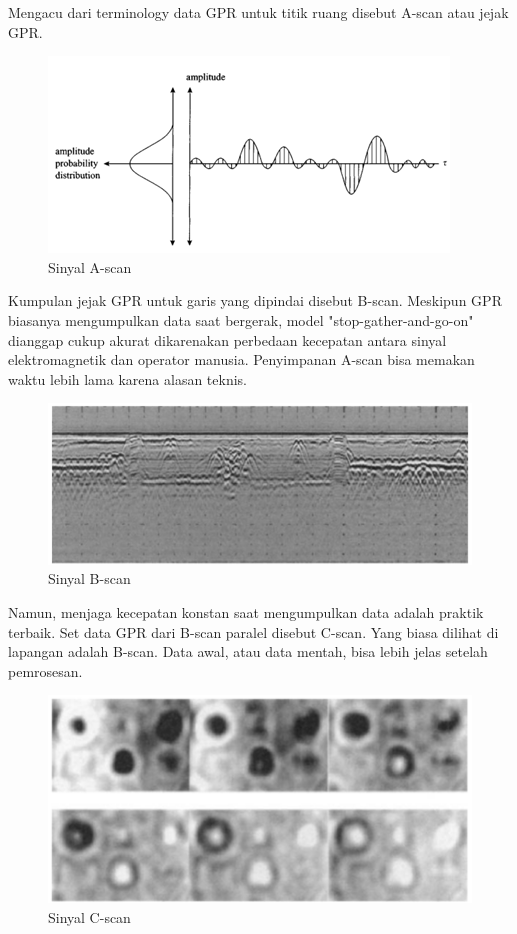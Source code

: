 Mengacu dari terminology data GPR untuk titik ruang disebut A-scan atau jejak GPR.
\begin{figure} [H] \centering
  \includegraphics[scale=1]{gambar/bab2/gpr2.png}
  \caption{Sinyal A-scan \parencite{Daniels2004}}
  \label{fig:GPRAscan}
\end{figure}
Kumpulan jejak GPR untuk garis yang dipindai disebut B-scan. Meskipun GPR biasanya mengumpulkan data saat bergerak, model "stop-gather-and-go-on" dianggap cukup akurat dikarenakan perbedaan kecepatan antara sinyal elektromagnetik dan operator manusia. Penyimpanan A-scan bisa memakan waktu lebih lama karena alasan teknis.
\begin{figure} [H] \centering
  \includegraphics[scale=1]{gambar/bab2/gpr3.png}
  \caption{Sinyal B-scan \parencite{Daniels2004}}
  \label{fig:GPRBscan}
\end{figure}
Namun, menjaga kecepatan konstan saat mengumpulkan data adalah praktik terbaik. Set data GPR dari B-scan paralel disebut C-scan. Yang biasa dilihat di lapangan adalah B-scan. Data awal, atau data mentah, bisa lebih jelas setelah pemrosesan\parencite{Daniels2004}.
\begin{figure} [H] \centering
  \includegraphics[scale=1]{gambar/bab2/gpr4.png}
  \caption{Sinyal C-scan \parencite{Daniels2004}}
  \label{fig:GPRCscan}
\end{figure}

